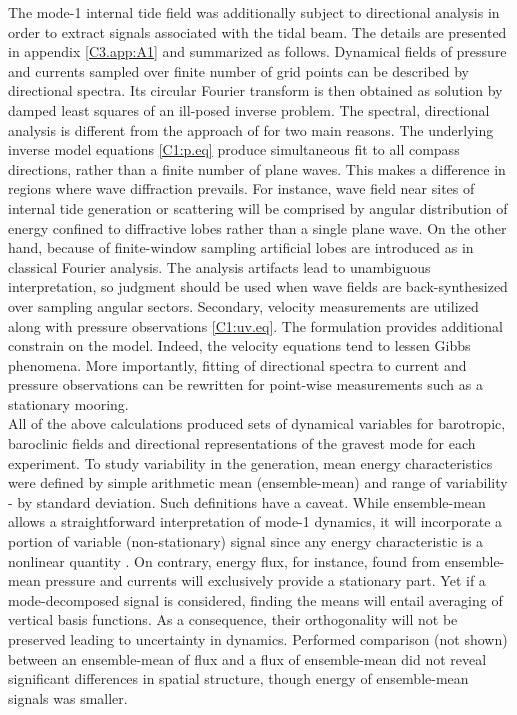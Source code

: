 \documentclass[12pt]{article}
\begin{document}
The mode-1 internal tide field was additionally subject to directional analysis in order to 
extract signals associated with the tidal beam. The details are presented in appendix 
\ref{C3.app:A1} and summarized as follows. Dynamical fields of pressure and currents sampled over 
finite number of grid points can be described by directional 
spectra. Its circular Fourier 
transform is then obtained as solution by damped least squares of an ill-posed inverse problem. The 
spectral, directional analysis is different from the approach of \cite{zhao2010long} for two main 
reasons. The underlying inverse model equations \eqref{C1:p.eq} produce simultaneous fit to all 
compass directions, rather than a finite number of plane waves. This makes a difference in regions 
where wave diffraction prevails. For instance, wave field near sites of internal tide generation or 
scattering will be comprised by angular distribution of energy confined to diffractive lobes 
\citep[e.g.,][]{munroe2005topographic, johnston2003internal} rather than a single plane wave. On 
the other hand, because of finite-window sampling artificial lobes are introduced as in classical 
Fourier analysis. The analysis artifacts lead to unambiguous interpretation, so judgment should be 
used when wave fields are back-synthesized over sampling angular sectors. Secondary, 
velocity measurements are utilized along with pressure observations \eqref{C1:uv.eq}. The 
formulation provides additional constrain on the model. Indeed, the velocity equations tend to 
lessen Gibbs phenomena. More importantly, fitting of directional spectra to current and pressure 
observations can be rewritten for point-wise measurements such as a stationary mooring.\\

All of the above calculations produced sets of dynamical variables for barotropic, baroclinic 
fields and directional representations of the gravest mode for each experiment. To study 
variability in the generation, mean energy characteristics were defined by simple arithmetic mean 
(ensemble-mean) and range of variability - by standard deviation. Such definitions have a caveat. 
While ensemble-mean allows a straightforward interpretation of mode-1 dynamics, it will incorporate 
a portion of variable (non-stationary) signal since any energy characteristic is a nonlinear 
quantity \citep{zaron2014time}. On contrary, energy flux, for instance, found from ensemble-mean 
pressure and currents will exclusively provide a stationary part. Yet if a mode-decomposed signal 
is considered, finding the means will entail averaging of vertical basis functions. As a 
consequence, their orthogonality will not be preserved leading to uncertainty in dynamics. 
Performed comparison (not shown) between an ensemble-mean of flux and a flux of ensemble-mean did 
not reveal significant differences in spatial structure, though energy of ensemble-mean signals was 
smaller. 
\end{document}
